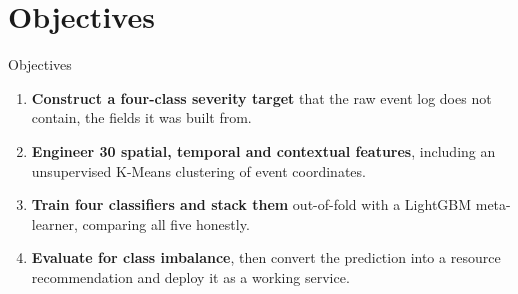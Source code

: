 \section{Objectives}

\begin{frame}{Objectives}
  \vspace{2mm}
  \begin{enumerate}\setlength{\itemsep}{5mm}
    \item \textbf{Construct a four-class severity target} that the raw event log
          does not contain,  the fields it was built from.
    \item \textbf{Engineer 30 spatial, temporal and contextual features},
          including an unsupervised K-Means clustering of event coordinates.
    \item \textbf{Train four classifiers and stack them} out-of-fold with a
          LightGBM meta-learner, comparing all five honestly.
    \item \textbf{Evaluate for class imbalance}, then convert the prediction
          into a resource recommendation and deploy it as a working service.
  \end{enumerate}
\end{frame}
